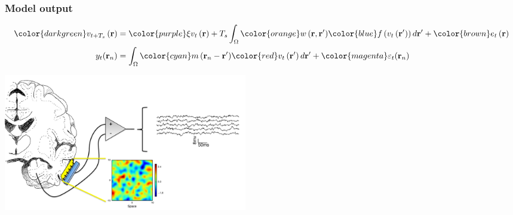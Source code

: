 \documentclass[compress]{beamer}
\begin{document}
\begin{frame}\frametitle{Model output}
	\begin{align}
		{\color{darkgreen}v_{t+T_s}\left(\mathbf{r}\right)} &= 
		{\color{purple}\xi v_t\left(\mathbf{r}\right)} + 
		T_s \int_\Omega { 
		    {\color{orange}w\left(\mathbf{r},\mathbf{r}'\right)}
		    {\color{blue}f\left(v_t\left(\mathbf{r}'\right)\right)} 
		\, d\mathbf{r}'} 
		+ {\color{brown}e_t\left(\mathbf{r}\right)} \nonumber \\
		y_t(\mathbf{r}_n) &= \int_{\Omega} { {\color{cyan}m\left(\mathbf{r}_n-\mathbf{r}'\right)} {\color{red}v_t\left(\mathbf{r}'\right)} \, d\mathbf{r}'} + {\color{magenta}\varepsilon_t(\mathbf{r}_n)} \nonumber 
	\end{align}
\begin{center} 
\includegraphics[height=6cm]{./Figures/ModelOutput.pdf}
\end{center}
\end{frame}

\end{document}
